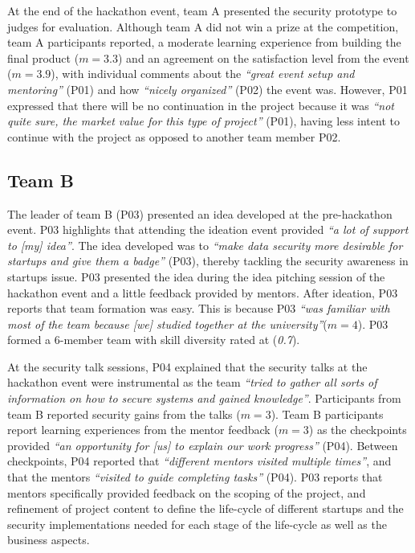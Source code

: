 \documentclass[runningheads]{llncs}
\begin{document}
At the end of the hackathon event, team A presented the security prototype to judges for evaluation. Although team A did not win a prize at the competition, team A participants reported, a moderate learning experience from building the final product ($m = 3.3$) and an agreement on the satisfaction level from the event ($m = 3.9$), with individual comments about the \textit{``great event setup and mentoring''} (P01) and how \textit{``nicely organized''} (P02) the event was. However, P01 expressed that there will be no continuation in the project because it was \textit{``not quite sure, the market value for this type of project''} (P01), having less intent to continue with the project as opposed to another team member P02.


\subsection{Team B}
The leader of team B (P03) presented an idea developed at the pre-hackathon event. P03 highlights that attending the ideation event provided \textit{``a lot of support to [my] idea''}. The idea developed was to \textit{``make data security more desirable for startups and give them a badge''} (P03), thereby tackling the security awareness in startups issue. P03 presented the idea during the idea pitching session of the hackathon event and a little feedback provided by mentors. After ideation, P03 reports that team formation was easy. This is because P03 \textit{``was familiar with most of the team because [we] studied together at the university''}($m = 4$). P03 formed a 6-member team with skill diversity rated at (\textit{0.7}).

At the security talk sessions, P04 explained that the security talks at the hackathon event were instrumental as the team \textit{``tried to gather all sorts of information on how to secure systems and gained knowledge''}. Participants from team B reported security gains from the talks ($m = 3$). Team B participants report learning experiences from the mentor feedback ($m = 3$) as the checkpoints provided \textit{``an opportunity for [us] to explain our work progress''} (P04). Between checkpoints, P04 reported that \textit{``different mentors visited multiple times''}, and that the mentors  \textit{``visited to guide completing tasks''} (P04). P03 reports that mentors specifically provided feedback on the scoping of the project, and refinement of project content to define the life-cycle of different startups and the security implementations needed for each stage of the life-cycle as well as the business aspects.
\end{document}

